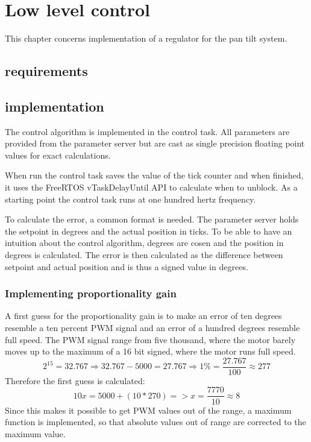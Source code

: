 \chapter{Low level control}\label{chap:llc}

This chapter concerns implementation of a regulator for the pan tilt system.

\section{requirements}

\section{implementation}
The control algorithm is implemented in the control task. All parameters are provided from the parameter server but are cast as single precision floating point values for exact calculations.

When run the control task saves the value of the tick counter and when finished, it uses the FreeRTOS vTaskDelayUntil API to calculate when to unblock. As a starting point the control task runs at one hundred hertz frequency.

To calculate the error, a common format is needed. The parameter server holds the setpoint in degrees and the actual position in ticks. To be able to have an intuition about the control algorithm, degrees are cosen and the position in degrees is calculated. The error is then calculated as the difference between setpoint and actual position and is thus a signed value in degrees.

\subsection{Implementing proportionality gain}
A first guess for the proportionality gain is to make an error of ten degrees resemble a ten percent PWM signal and an error of a hundred degrees resemble full speed. The PWM signal range from five thousand, where the motor barely moves up to the maximum of a 16 bit signed, where the motor runs full speed.
\begin{equation}
2^{15} = 32.767 \Rightarrow 
32.767 - 5000 = 27.767 \Rightarrow 
1 \% = \frac{27.767}{100} \approx  277
	\label{eq:PWM}
\end{equation}
 Therefore the first guess is calculated:
\begin{equation}
10x = 5000 + (10 * 270) => x = \frac{7770}{10} \approx  8
	\label{eq:P-term}
\end{equation}
Since this makes it possible to get PWM values out of the range, a maximum function is implemented, so that absolute values out of range are corrected to the maximum value.

